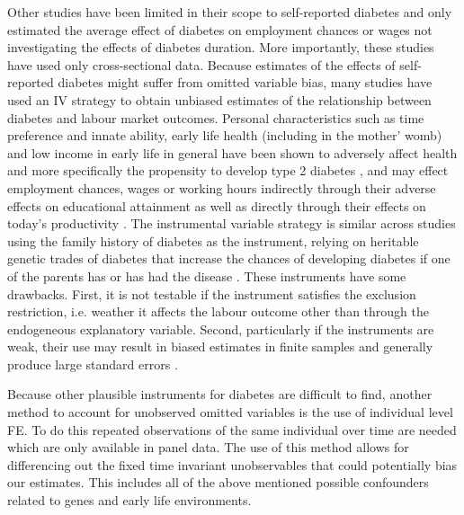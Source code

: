 Other studies have been limited in their scope to self-reported diabetes
and only estimated the average effect of diabetes on employment chances
or wages not investigating the effects of diabetes duration. More importantly,
these studies have used only cross-sectional data. Because estimates of the effects of self-reported
diabetes might suffer from omitted variable bias, many studies have
used an \ac{IV} strategy to obtain unbiased estimates of the relationship
between diabetes and labour market outcomes. Personal characteristics such as time preference
and innate ability, early life health (including
in the mother' womb) and low income in early life in general have been shown to
adversely affect health and more specifically the propensity to develop
type 2 diabetes \citep{VanEwijk2011a,Sotomayor2013,Li2010b}, and
may effect employment chances, wages or working hours indirectly
through their adverse effects on educational attainment \citep{Ayyagari2011b}
as well as directly through their effects on today's productivity
\citep{Currie2013}. The instrumental variable strategy is similar across studies using the family
history of diabetes as the instrument, relying on heritable genetic
trades of diabetes that increase the chances of developing diabetes
if one of the parents has or has had the disease \citep{Brown2005,Latif2009,Minor2010a,Lin2011b,Seuring2015}.
These instruments have some drawbacks. First, it
is not testable if the instrument satisfies the exclusion restriction, i.e. weather it affects the labour outcome other than through the endogeneous explanatory variable. Second, particularly if the instruments are weak, their use may result in biased estimates in finite samples and generally produce
large standard errors \citep{Bound1995}. 

Because other plausible instruments for diabetes are difficult to
find, another method to account for unobserved omitted variables is
the use of individual level \ac{FE}. To do this repeated observations
of the same individual over time are needed which are only available
in panel data. The use of this method allows for differencing out
the fixed time invariant unobservables that could potentially bias
our estimates. This includes all of the above mentioned possible confounders
related to genes and early life environments.

